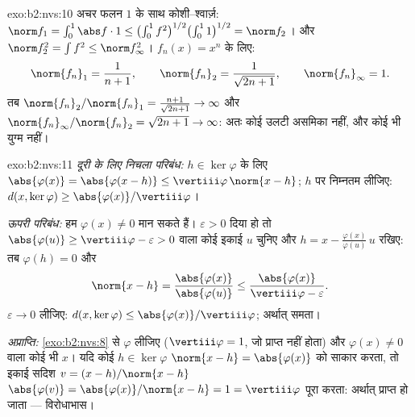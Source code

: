 \begin{solution}{exo:b2:nvs:10}
अचर फलन $1$ के साथ कोशी--श्वार्ज़: $\norm f_1 =
\int_0^1 \abs f\cdot 1 \leq \bigl(\int_0^1
f^2\bigr)^{1/2}\bigl(\int_0^1 1\bigr)^{1/2} = \norm f_2$। और $\norm f_2^2 = \int f^2 \leq \norm f_\infty^2$। $f_n(x) =
x^n$ के लिए:
\[
\norm{f_n}_1 = \frac1{n+1}, \qquad
\norm{f_n}_2 = \frac1{\sqrt{2n+1}}, \qquad
\norm{f_n}_\infty = 1 .
\]
तब $\norm{f_n}_2/\norm{f_n}_1 = \frac{n+1}{\sqrt{2n+1}} \to
\infty$ और $\norm{f_n}_\infty/\norm{f_n}_2 = \sqrt{2n+1} \to
\infty$: अतः कोई उलटी असमिका नहीं, और कोई भी युग्म  नहीं।
\end{solution}

\begin{solution}{exo:b2:nvs:11}
\emph{दूरी के लिए निचला परिबंध:} $h \in \ker\varphi$ के लिए $\abs{\varphi(x)} = \abs{\varphi(x - h)} \leq
\vertiii\varphi\,\norm{x - h}$; $h$ पर निम्नतम लीजिए:
$d(x, \ker\varphi) \geq \abs{\varphi(x)}/\vertiii\varphi$।

\emph{ऊपरी परिबंध:} हम $\varphi(x) \neq 0$ मान सकते हैं। $\varepsilon > 0$ दिया हो तो $\abs{\varphi(u)} \geq
\vertiii\varphi - \varepsilon > 0$ वाला कोई
इकाई $u$ चुनिए और $h = x -
\frac{\varphi(x)}{\varphi(u)}\,u$ रखिए: तब $\varphi(h) = 0$ और
\[
\norm{x - h} = \frac{\abs{\varphi(x)}}{\abs{\varphi(u)}}
\leq \frac{\abs{\varphi(x)}}{\vertiii\varphi - \varepsilon}.
\]
$\varepsilon \to 0$ लीजिए: $d(x, \ker\varphi) \leq
\abs{\varphi(x)}/\vertiii\varphi$; अर्थात् समता।

\emph{अप्राप्ति:} \cref{exo:b2:nvs:8} से $\varphi$ लीजिए ($\vertiii\varphi = 1$, जो प्राप्त नहीं होता) और $\varphi(x) \neq 0$
वाला कोई भी $x$। यदि कोई $h \in \ker\varphi$ $\norm{x - h} = \abs{\varphi(x)}$ को साकार करता, तो इकाई सदिश $v = (x -
h)/\norm{x - h}$ $\abs{\varphi(v)} =
\abs{\varphi(x)}/\norm{x - h} = 1 = \vertiii\varphi$
पूरा करता: अर्थात्  प्राप्त हो जाता --- विरोधाभास।
\end{solution}

